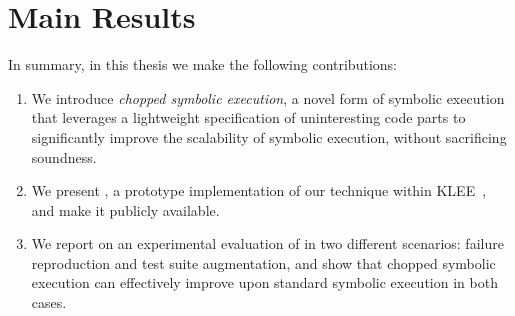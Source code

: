 \section{Main Results}
In summary, in this thesis we make the following contributions:
\begin{enumerate}[leftmargin=*]
\item We introduce \emph{chopped symbolic execution}, a novel form of
  symbolic execution that leverages a lightweight specification of
  uninteresting code parts to significantly improve the scalability of
  symbolic execution, without sacrificing soundness.

\item We present \toolname, a prototype implementation of our
  technique within KLEE~\cite{klee}, and make it publicly available.

\item We report on an experimental evaluation of \toolname in two
  different scenarios: failure reproduction and test suite
  augmentation, and show that chopped symbolic execution can
  effectively improve upon standard symbolic execution in both cases.
\end{enumerate}


